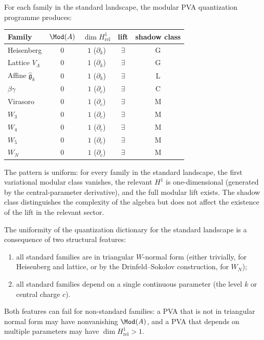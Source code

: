\begin{construction}
For each family in the standard landscape, the modular PVA quantization
programme produces:

\smallskip
\begin{center}
\begin{tabular}{l c c c c}
Family & $\Mod(A)$ & $\dim H^1_{\mathrm{rel}}$ & lift & shadow class \\
\hline
Heisenberg & $0$ & $1$ ($\partial_k$) & $\exists$ & G \\
Lattice $V_\Lambda$ & $0$ & $1$ ($\partial_k$) & $\exists$ & G \\
Affine $\widehat{\mathfrak{g}}_k$ & $0$ & $1$ ($\partial_k$) & $\exists$ & L \\
$\beta\gamma$ & $0$ & $1$ ($\partial_c$) & $\exists$ & C \\
Virasoro & $0$ & $1$ ($\partial_c$) & $\exists$ & M \\
$W_3$ & $0$ & $1$ ($\partial_c$) & $\exists$ & M \\
$W_4$ & $0$ & $1$ ($\partial_c$) & $\exists$ & M \\
$W_5$ & $0$ & $1$ ($\partial_c$) & $\exists$ & M \\
$W_N$ & $0$ & $1$ ($\partial_c$) & $\exists$ & M
\end{tabular}
\end{center}

\smallskip
\noindent
The pattern is uniform: for every family in the standard landscape,
the first variational modular class vanishes, the relevant $H^1$ is
one-dimensional (generated by the central-parameter derivative), and
the full modular lift exists. The shadow class distinguishes the
complexity of the algebra but does not affect the existence of the
lift in the relevant sector.
\end{construction}

\begin{remark}
The uniformity of the quantization dictionary for the standard landscape
is a consequence of two structural features:
\begin{enumerate}[leftmargin=2.4em]
\item all standard families are in triangular $W$-normal form
(either trivially, for Heisenberg and lattice, or by the
Drinfeld--Sokolov construction, for $W_N$);
\item all standard families depend on a single continuous parameter
(the level $k$ or central charge $c$).
\end{enumerate}
Both features can fail for non-standard families: a PVA that is not
in triangular normal form may have nonvanishing $\Mod(A)$, and a
PVA that depends on multiple parameters may have
$\dim H^1_{\mathrm{rel}} > 1$.
\end{remark}

